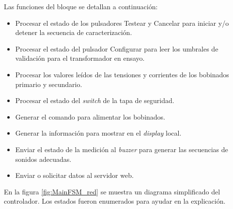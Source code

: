 Las funciones del bloque se detallan a continuación:

\begin{itemize}
\item Procesar el estado de los pulsadores Testear y Cancelar para iniciar y/o detener la secuencia de caracterización.
\item Procesar el estado del pulsador Configurar para leer los umbrales de validación para el transformador en ensayo.
\item Procesar los valores leídos de las tensiones y corrientes de los bobinados primario y secundario.
\item Procesar el estado del \textit{switch} de la tapa de seguridad.
\item Generar el comando para alimentar los bobinados.
\item Generar la información para mostrar en el \textit{display} local.
\item Enviar el estado de la medición al \textit{buzzer} para generar las secuencias de sonidos adecuadas.
\item Enviar o solicitar datos al servidor web.
\end{itemize}

En la figura \ref{fig:MainFSM_red} se muestra un diagrama simplificado del controlador. Los estados fueron enumerados para ayudar en la explicación.

